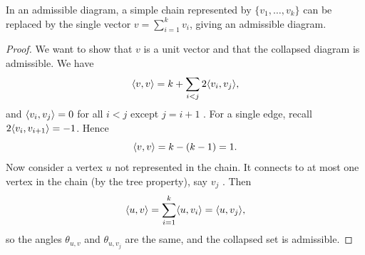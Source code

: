 \begin{lemma}\label{L04a:lem:collapse}
In an admissible diagram, a simple chain represented by $\{v_1,\dots,v_k\}$ can be replaced by the single
vector $v=\sum_{i=1}^k v_i$, giving an admissible diagram.
\end{lemma}

\begin{proof}
We want to show that $v$ is a unit vector and that the collapsed diagram is admissible.
We have
\[
  \langle v, v\rangle = k + \sum_{i<j}2\langle v_i, v_j\rangle,
\]
and $\langle v_i, v_j\rangle=0$ for all $i<j$ except $j=i+1$ .
For a single edge, recall $2\langle v_i, v_{i+1}\rangle=-1$. Hence
\[
  \langle v, v\rangle = k-(k-1) = 1 .
\]
Now consider a vertex $u$ not represented in the chain. It connects to at most one vertex in the chain
(by the tree property), say $v_j$ . Then
\[
  \langle u, v\rangle=\sum_{i=1}^k\langle u, v_i\rangle=\langle u, v_j\rangle,
\]
so the angles $\theta_{u,v}$ and $\theta_{u,v_j}$ are the same, and the collapsed set is admissible.
\end{proof}
